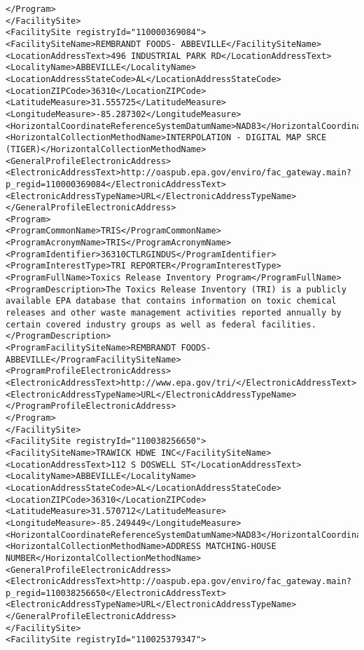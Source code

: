 \documentclass[11pt,english]{article}
\begin{document}
\begin{lstlisting}
</Program>
</FacilitySite>
<FacilitySite registryId="110000369084">
<FacilitySiteName>REMBRANDT FOODS- ABBEVILLE</FacilitySiteName>
<LocationAddressText>496 INDUSTRIAL PARK RD</LocationAddressText>
<LocalityName>ABBEVILLE</LocalityName>
<LocationAddressStateCode>AL</LocationAddressStateCode>
<LocationZIPCode>36310</LocationZIPCode>
<LatitudeMeasure>31.555725</LatitudeMeasure>
<LongitudeMeasure>-85.287302</LongitudeMeasure>
<HorizontalCoordinateReferenceSystemDatumName>NAD83</HorizontalCoordinateReferenceSystemDatumName>
<HorizontalCollectionMethodName>INTERPOLATION - DIGITAL MAP SRCE (TIGER)</HorizontalCollectionMethodName>
<GeneralProfileElectronicAddress>
<ElectronicAddressText>http://oaspub.epa.gov/enviro/fac_gateway.main?p_regid=110000369084</ElectronicAddressText>
<ElectronicAddressTypeName>URL</ElectronicAddressTypeName>
</GeneralProfileElectronicAddress>
<Program>
<ProgramCommonName>TRIS</ProgramCommonName>
<ProgramAcronymName>TRIS</ProgramAcronymName>
<ProgramIdentifier>36310CTLRGINDUS</ProgramIdentifier>
<ProgramInterestType>TRI REPORTER</ProgramInterestType>
<ProgramFullName>Toxics Release Inventory Program</ProgramFullName>
<ProgramDescription>The Toxics Release Inventory (TRI) is a publicly available EPA database that contains information on toxic chemical releases and other waste management activities reported annually by certain covered industry groups as well as federal facilities.</ProgramDescription>
<ProgramFacilitySiteName>REMBRANDT FOODS- ABBEVILLE</ProgramFacilitySiteName>
<ProgramProfileElectronicAddress>
<ElectronicAddressText>http://www.epa.gov/tri/</ElectronicAddressText>
<ElectronicAddressTypeName>URL</ElectronicAddressTypeName>
</ProgramProfileElectronicAddress>
</Program>
</FacilitySite>
<FacilitySite registryId="110038256650">
<FacilitySiteName>TRAWICK HDWE INC</FacilitySiteName>
<LocationAddressText>112 S DOSWELL ST</LocationAddressText>
<LocalityName>ABBEVILLE</LocalityName>
<LocationAddressStateCode>AL</LocationAddressStateCode>
<LocationZIPCode>36310</LocationZIPCode>
<LatitudeMeasure>31.570712</LatitudeMeasure>
<LongitudeMeasure>-85.249449</LongitudeMeasure>
<HorizontalCoordinateReferenceSystemDatumName>NAD83</HorizontalCoordinateReferenceSystemDatumName>
<HorizontalCollectionMethodName>ADDRESS MATCHING-HOUSE NUMBER</HorizontalCollectionMethodName>
<GeneralProfileElectronicAddress>
<ElectronicAddressText>http://oaspub.epa.gov/enviro/fac_gateway.main?p_regid=110038256650</ElectronicAddressText>
<ElectronicAddressTypeName>URL</ElectronicAddressTypeName>
</GeneralProfileElectronicAddress>
</FacilitySite>
<FacilitySite registryId="110025379347">

\end{lstlisting}
\end{document}
